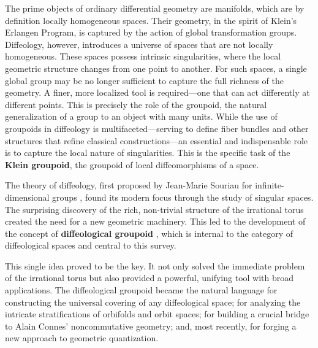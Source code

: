 \documentclass[10pt,reqno,letterpaper,twoside]{amsart}
\theoremstyle{article}
\begin{document}
  The prime objects of ordinary differential geometry are manifolds,
  which are by definition locally homogeneous spaces.
  Their geometry,
  in the spirit of Klein's Erlangen Program,
  is captured by the action of global transformation groups.
  Diffeology,
  however,
  introduces a universe of spaces that are not locally homogeneous.
  These spaces possess intrinsic singularities,
  where the local geometric structure changes from one point to another.
  For such spaces,
  a single global group may be no longer sufficient to capture the full richness of the geometry.
  A finer,
  more localized tool is required—one that can act differently at different points.
  This is precisely the role of the groupoid,
  the natural generalization of a group to an object with many units.
  While the use of groupoids in diffeology is multifaceted—serving to define fiber bundles and other structures that refine classical constructions—an essential and indispensable role is to capture the local nature of singularities.
  This is the specific task of the \textbf{Klein groupoid},
  the groupoid of local diffeomorphisms of a space.
  
  The theory of diffeology,
  first proposed by Jean-Marie Souriau for infinite-dimensional groups \cite{Sou80},
  found its modern focus through the study of singular spaces.
  The surprising discovery of the rich,
  non-trivial structure of the irrational torus \cite{DIZ83} created the need for a new geometric machinery.
  This led to the development of the concept of \textbf{diffeological groupoid} \cite{PIZ85},
  which is internal to the category of diffeological spaces and central to this survey.
  
  This single idea proved to be the key.
  It not only solved the immediate problem of the irrational torus but also provided a powerful,
  unifying tool with broad applications.
  The diffeological groupoid became the natural language for constructing the universal covering of any diffeological space;
  for analyzing the intricate stratifications of orbifolds and orbit spaces;
  for building a crucial bridge to Alain Connes' noncommutative geometry;
  and,
  most recently,
  for forging a new approach to geometric quantization.
  
\end{document}
